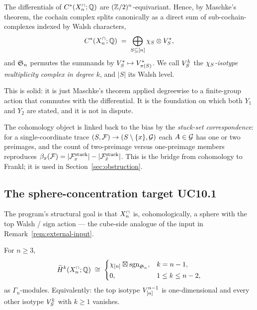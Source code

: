\begin{theorem}
\label{thm:walsh-decomposition}
The differentials of $C^*(X^{\cap}_n;\mathbb{Q})$ are $(\mathbb{Z}/2)^n$-equivariant. Hence,
by Maschke's theorem, the cochain complex splits canonically as a
direct sum of sub-cochain-complexes indexed by Walsh characters,
\[
  C^*(X^{\cap}_n;\mathbb{Q})\;=\;\bigoplus_{S\subseteq[n]}\chi_{S}\otimes
  V_{S}^{*},
\]
and $\mathfrak{S}_n$ permutes the summands by $V_{S}^{*}\mapsto
V_{\pi(S)}^{*}$. We call $V_{S}^{k}$ the
\emph{$\chi_{S}$-isotype multiplicity complex in degree $k$}, and
$|S|$ its Walsh level.
\end{theorem}

This is solid: it is just Maschke's theorem applied degreewise to a
finite-group action that commutes with the differential. It is the
foundation on which both $Y_1$ and $Y_2$ are stated, and it is not in
dispute.

The cohomology object is linked back to the bias by the
\emph{stuck-set correspondence}: for a single-coordinate trace
$(S,\mathcal{F})\to(S\setminus\{x\},\mathcal{G})$ each $A\in\mathcal{G}$ has one or two preimages,
and the count of two-preimage versus one-preimage members reproduces
$\beta_x(\mathcal{F})=|\mathcal{F}^{\mathrm{stuck}}_x|-|\mathcal{F}^{\mathrm{stuck}}_{\bar x}|$. This is the
bridge from cohomology to Frankl; it is used in
Section~\ref{sec:obstruction}.

\subsection{The sphere-concentration target UC10.1}
\label{ssec:uc10-1}

The program's structural goal is that $X^{\cap}_n$ is, cohomologically, a
sphere with the top Walsh / sign action --- the cube-side analogue of
the input in Remark~\ref{rem:external-input}.

\begin{conjecture}
\label{conj:uc10-1}
For $n\ge3$,
\[
  \widetilde H^{k}(X^{\cap}_n;\mathbb{Q})\;\cong\;
  \begin{cases}
    \chi_{[n]}\boxtimes\mathrm{sgn}_{\mathfrak{S}_n}, & k=n-1,\\[2pt]
    0, & 1\le k\le n-2,
  \end{cases}
\]
as $\Gamma_n$-modules. Equivalently: the top isotype
$V_{[n]}^{n-1}$ is one-dimensional and every other isotype
$V_{S}^{k}$ with $k\ge1$ vanishes.
\end{conjecture}

